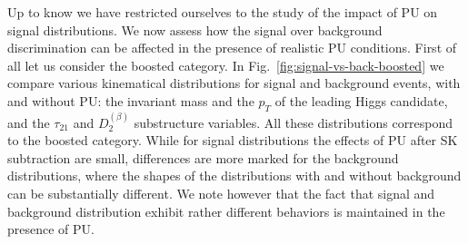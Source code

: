 Up to know we have restricted ourselves to the study of the impact of PU
on signal distributions.
%
We now assess how the signal over background discrimination can be affected
in the presence of realistic PU conditions.
%
First of all let us consider the boosted category.
%
In Fig.~\ref{fig:signal-vs-back-boosted} we compare
various kinematical distributions for signal and background events,
     with and without PU: the invariant mass and the $p_T$ of the leading
     Higgs candidate, and the $\tau_{21}$ and $D^{(\beta)}_2$ substructure variables.
     All these distributions correspond to the boosted category.
     While for signal distributions the effects of PU after SK subtraction are small,
     differences are more marked for the background distributions, where
     the shapes of the distributions with and without background can be substantially
     different.
     We note however that the fact that signal and background distribution exhibit
     rather different behaviors is maintained in the presence of PU.
     

